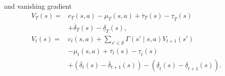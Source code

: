 and vanishing gradient
\begin{equation}
\begin{aligned}
V_T(s)=&c_T(s, a)-\mu_T(s, a)+\overline{\tau}_T(s)-\underline{\tau}_T(s)\\
&+\overline{\delta}_{T}(s)-\underline{\delta}_{T}(s),\\
V_t(s)=&c_t(s, a)+\sum\limits_{s'\in\mathcal{S}}\Gamma(s'\mid s, a) V_{t+1}(s')\\
&-\mu_t(s, a)+\overline{\tau}_t(s)-\underline{\tau}_t(s)\\
&+(\overline{\delta}_{t}(s)-\overline{\delta}_{t+1}(s))-(\underline{\delta}_{t}(s)-\underline{\delta}_{t+1}(s)).
\end{aligned}\label{consMDP: vanishing gradient}
\end{equation}

